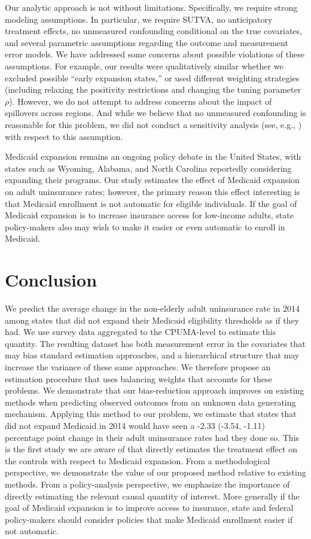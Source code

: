 \documentclass[aoas]{imsart}
\theoremstyle{plain}
\theoremstyle{remark}
\begin{document}
Our analytic approach is not without limitations. Specifically, we require strong modeling assumptions. In particular, we require SUTVA, no anticipatory treatment effects, no unmeasured confounding conditional on the true covariates, and several parametric assumptions regarding the outcome and measurement error models. We have addressed some concerns about possible violations of these assumptions. For example, our results were qualitatively similar whether we excluded possible ``early expansion states,'' or used different weighting strategies (including relaxing the positivity restrictions and changing the tuning parameter $\rho$). However, we do not attempt to address concerns about the impact of spillovers across regions. And while we believe that no unmeasured confounding is reasonable for this problem, we did not conduct a sensitivity analysis (see, e.g., \cite{bonvini2021sensitivity}) with respect to this assumption. 

Medicaid expansion remains an ongoing policy debate in the United States, with states such as Wyoming, Alabama, and North Carolina reportedly considering expanding their programs. Our study estimates the effect of Medicaid expansion on adult uninsurance rates; however, the primary reason this effect interesting is that Medicaid enrollment is not automatic for eligible individuals. If the goal of Medicaid expansion is to increase insurance access for low-income adults, state policy-makers also may wish to make it easier or even automatic to enroll in Medicaid. 

\section{Conclusion}

We predict the average change in the non-elderly adult uninsurance rate in 2014 among states that did not expand their Medicaid eligibility thresholds as if they had. We use survey data aggregated to the CPUMA-level to estimate this quantity. The resulting dataset has both measurement error in the covariates that may bias standard estimation approaches, and a hierarchical structure that may increase the variance of these same approaches. We therefore propose an estimation procedure that uses balancing weights that accounts for these problems. We demonstrate that our bias-reduction approach improves on existing methods when predicting observed outcomes from an unknown data generating mechanism. Applying this method to our problem, we estimate that states that did not expand Medicaid in 2014 would have seen a -2.33 (-3.54, -1.11) percentage point change in their adult uninsurance rates had they done so. This is the first study we are aware of that directly estimates the treatment effect on the controls with respect to Medicaid expansion. From a methodological perspective, we demonstrate the value of our proposed method relative to existing methods. From a policy-analysis perspective, we emphasize the importance of directly estimating the relevant causal quantity of interest. More generally if the goal of Medicaid expansion is to improve access to insurance, state and federal policy-makers should consider policies that make Medicaid enrollment easier if not automatic.
\end{document}
